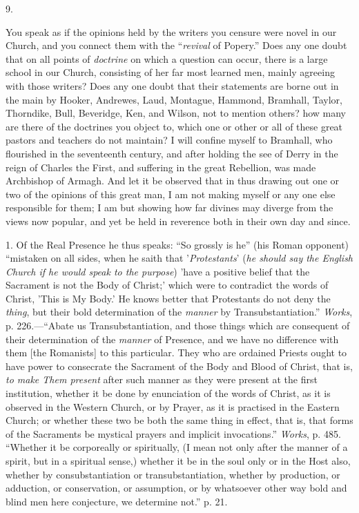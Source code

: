 9.

You speak as if the opinions held by the writers
you censure were novel in our Church, and you connect them with the ``\emph{revival} of Popery.'' Does any one doubt that on all points
of \emph{doctrine} on which a question can occur, there is a large
school in our Church, consisting of her far most learned men, mainly
agreeing with those writers? Does any one doubt that their statements
are borne out in the main by Hooker, Andrewes, Laud, Montague,
Hammond, Bramhall, Taylor, Thorndike, Bull, Beveridge, Ken, and
Wilson, not to mention others? how many are there of the doctrines you
object to, which one or other or all of these great pastors and
teachers do not maintain? I will confine myself to Bramhall, who
flourished in the seventeenth century, and after holding the see of
Derry in the reign of Charles the First, and suffering in the
great Rebellion, was made Archbishop of Armagh. And let it be observed
that in thus drawing out one or two of the opinions of this great man,
I am not making myself or any one else responsible for them; I am but
showing how far divines may diverge from the views now popular, and
yet be held in reverence both in their own day and since.

1. Of the Real Presence he thus speaks: ``So
grossly is he'' (his Roman opponent) ``mistaken on all sides, when
he saith that '\emph{Protestants}' (\emph{he should say the English
Church if he would speak to the purpose}) 'have a positive belief
that the Sacrament is not the Body of Christ;' which were to
contradict the words of Christ, 'This is My Body.' He knows better
that Protestants do not deny the \emph{thing}, but their bold
determination of the \emph{manner} by Transubstantiation.'' \emph{Works},
p. 226.—``Abate us Transubstantiation, and those things which are
consequent of their determination of the \emph{manner} of Presence,
and we have no difference with them [the Romanists] to this
particular. They who are ordained Priests ought to have power to
consecrate the Sacrament of the Body and Blood of Christ, that is, \emph{to
make Them present} after such manner as they were present at the
first institution, whether it be done by enunciation of the words of
Christ, as it is observed in the Western Church, or by Prayer, as it
is practised in the Eastern Church; or whether these two be both the
same thing in effect, that is, that forms of the Sacraments be
mystical prayers and implicit invocations.'' \emph{Works}, p. 485. ``Whether it be corporeally or spiritually, (I mean not only after
the manner of a spirit, but in a spiritual sense,) whether it be in
the soul only or in the Host also, whether by consubstantiation or
transubstantiation, whether by production, or adduction, or
conservation, or assumption, or by whatsoever other way bold and blind
men here conjecture, we determine not.'' p. 21.

